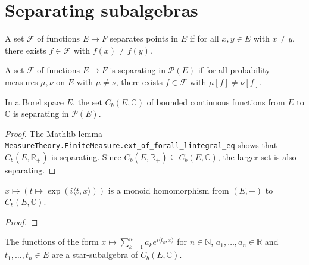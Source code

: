 \chapter{Separating subalgebras}

\begin{definition}\label{def:separates_points}
\mathlibok
{}
A set $\mathcal F$ of functions $E \to F$ separates points in $E$ if for all $x, y \in E$ with $x \ne y$, there exists $f \in \mathcal F$ with $f(x) \ne f(y)$.
\end{definition}

\begin{definition}\label{def:separating}
 \leanok
A set $\mathcal F$ of functions $E \to F$ is separating in $\mathcal P(E)$ if for all probability measures $\mu, \nu$ on $E$ with $\mu \ne \nu$, there exists $f \in \mathcal F$ with $\mu[f] \ne \nu[f]$.
\end{definition}


\begin{lemma}\label{lem:bounded_continuous_separating}
In a Borel space $E$, the set $C_b(E, \mathbb{C})$ of bounded continuous functions from $E$ to $\mathbb{C}$ is separating in $\mathcal P(E)$.
\end{lemma}

\begin{proof}
The Mathlib lemma \texttt{MeasureTheory.FiniteMeasure.ext\_of\_forall\_lintegral\_eq} shows that $C_b(E, \mathbb{R}_+)$ is separating. Since $C_b(E, \mathbb{R}_{+}) \subseteq C_b(E, \mathbb{C})$, the larger set is also separating.
\end{proof}


\begin{lemma}\label{lem:exp_character}
 \leanok
$x \mapsto (t \mapsto \exp(i \langle t, x \rangle))$ is a monoid homomorphism from $(E,+)$ to $C_b(E, \mathbb{C})$.
\end{lemma}

\begin{proof}\leanok
\end{proof}


\begin{lemma}\label{lem:starSubalgebra_expPoly}
 \leanok
The functions of the form $x \mapsto \sum_{k=1}^n a_k e^{i\langle t_k, x\rangle}$ for $n \in \mathbb{N}$, $a_1, \ldots, a_n \in \mathbb{R}$ and $t_1, \ldots, t_n \in E$ are a star-subalgebra of $C_b(E, \mathbb{C})$. 
\end{lemma}

